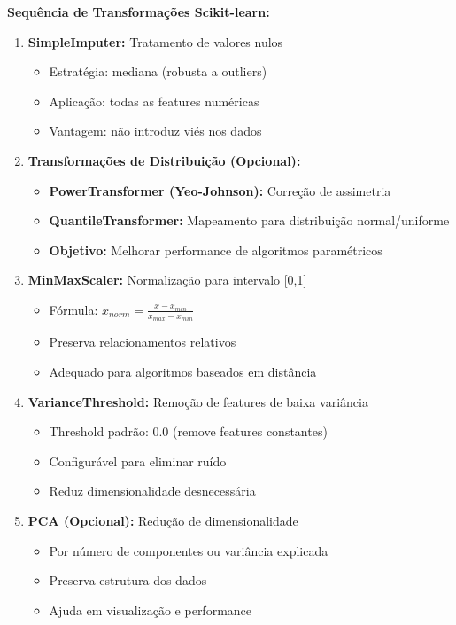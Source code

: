 \textbf{Sequência de Transformações Scikit-learn:}

\begin{enumerate}
    \item \textbf{SimpleImputer:} Tratamento de valores nulos
    \begin{itemize}
        \item Estratégia: mediana (robusta a outliers)
        \item Aplicação: todas as features numéricas
        \item Vantagem: não introduz viés nos dados
    \end{itemize}

    \item \textbf{Transformações de Distribuição (Opcional):}
    \begin{itemize}
        \item \textbf{PowerTransformer (Yeo-Johnson):} Correção de assimetria
        \item \textbf{QuantileTransformer:} Mapeamento para distribuição normal/uniforme
        \item \textbf{Objetivo:} Melhorar performance de algoritmos paramétricos
    \end{itemize}

    \item \textbf{MinMaxScaler:} Normalização para intervalo [0,1]
    \begin{itemize}
        \item Fórmula: $x_{norm} = \frac{x - x_{min}}{x_{max} - x_{min}}$
        \item Preserva relacionamentos relativos
        \item Adequado para algoritmos baseados em distância
    \end{itemize}

    \item \textbf{VarianceThreshold:} Remoção de features de baixa variância
    \begin{itemize}
        \item Threshold padrão: 0.0 (remove features constantes)
        \item Configurável para eliminar ruído
        \item Reduz dimensionalidade desnecessária
    \end{itemize}

    \item \textbf{PCA (Opcional):} Redução de dimensionalidade
    \begin{itemize}
        \item Por número de componentes ou variância explicada
        \item Preserva estrutura dos dados
        \item Ajuda em visualização e performance
    \end{itemize}
\end{enumerate}

